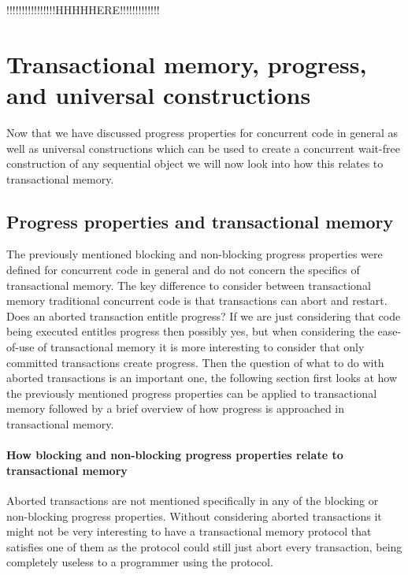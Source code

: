 



!!!!!!!!!!!!!!!!HHHHHERE!!!!!!!!!!!!!




\section{Transactional memory, progress, and universal constructions}
Now that we have discussed progress properties for
concurrent code in general as well as
universal constructions which can be used to create
a concurrent wait-free construction of any sequential object
we will now look into how this relates to transactional memory.

\subsection{Progress properties and transactional memory}

The previously mentioned blocking and non-blocking progress
properties were defined for concurrent code in general
and do not concern the specifics of transactional memory.
The key difference to consider between transactional memory traditional concurrent
code is that transactions can abort and restart.
Does an aborted transaction entitle progress?
If we are just considering that code being executed entitles
progress then possibly yes, but when considering the ease-of-use of transactional
memory it is more interesting to consider that only committed transactions
create progress.
Then the question of what to do with aborted transactions is an important one,
the following section first looks at how the previously mentioned progress
properties can be applied to transactional memory
followed by a brief overview of how progress is approached in transactional
memory.

\paragraph{How blocking and non-blocking progress properties relate to transactional memory}
Aborted transactions are not mentioned specifically in any of the blocking
or non-blocking progress properties.
Without considering aborted transactions it might not be very interesting
to have a transactional memory protocol that satisfies one of them
as the protocol could still just abort every transaction, being completely
useless to a programmer using the protocol.

